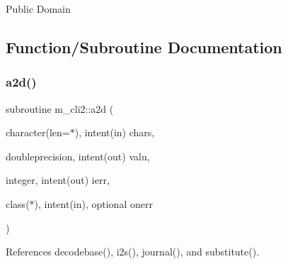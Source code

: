 Public Domain 

\subsection{Function/\+Subroutine Documentation}
\mbox{\label{namespacem__cli2_ad9e1de0ea9d2b4ed758b2a76bf143bd2}} 
\subsubsection{\texorpdfstring{a2d()}{a2d()}}
{\footnotesize\ttfamily subroutine m\+\_\+cli2\+::a2d (\begin{DoxyParamCaption}\item[{character(len=$\ast$), intent(in)}]{chars,  }\item[{doubleprecision, intent(out)}]{valu,  }\item[{integer, intent(out)}]{ierr,  }\item[{class($\ast$), intent(in), optional}]{onerr }\end{DoxyParamCaption})\hspace{0.3cm}{\ttfamily [private]}}



References decodebase(), i2s(), journal(), and substitute().

